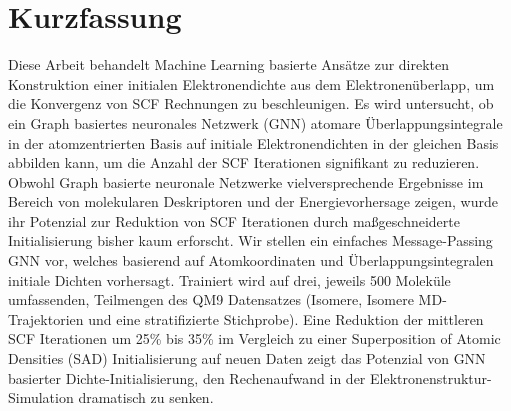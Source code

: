 \chapter*{Kurzfassung}

Diese Arbeit behandelt Machine Learning basierte Ansätze zur direkten Konstruktion einer initialen Elektronendichte aus dem Elektronenüberlapp, um die Konvergenz von SCF Rechnungen zu beschleunigen. Es wird untersucht, ob ein Graph basiertes neuronales Netzwerk (GNN) atomare Überlappungsintegrale in der atomzentrierten Basis auf initiale Elektronendichten in der gleichen Basis abbilden kann, um die Anzahl der SCF Iterationen signifikant zu reduzieren. Obwohl Graph basierte neuronale Netzwerke vielversprechende Ergebnisse im Bereich von molekularen Deskriptoren und der Energievorhersage zeigen, wurde ihr Potenzial zur Reduktion von SCF Iterationen durch maßgeschneiderte Initialisierung bisher kaum erforscht. Wir stellen ein einfaches Message-Passing GNN vor, welches basierend auf Atomkoordinaten und Überlappungsintegralen initiale Dichten vorhersagt. Trainiert wird auf drei, jeweils 500 Moleküle umfassenden, Teilmengen des QM9 Datensatzes (Isomere, Isomere MD-Trajektorien und eine stratifizierte Stichprobe). Eine Reduktion der mittleren SCF Iterationen um 25\% bis 35\% im Vergleich zu einer Superposition of Atomic Densities (SAD) Initialisierung auf neuen Daten zeigt das Potenzial von GNN basierter Dichte-Initialisierung, den Rechenaufwand in der Elektronenstruktur-Simulation dramatisch zu senken.